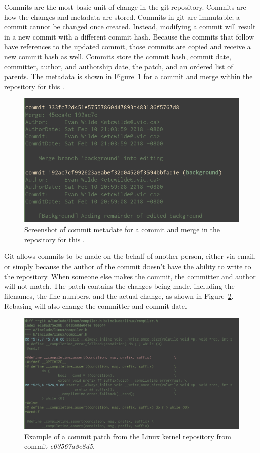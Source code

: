 Commits are the most basic unit of change in the git repository.
Commits are how the changes and metadata are stored.
Commits in git are immutable; a commit cannot be changed once created.
Instead, modifying a commit will result
in a new commit with a different commit hash.
Because the commits that follow have references to the updated commit,
those commits are copied and receive a new commit hash as well.
Commits store the commit hash, commit date,
committer, author, and authorship date, the patch, and an ordered list
of parents. The metadata is shown in Figure~\ref{fig:commit_metadata}
for a commit and merge within the repository for this \paper{}.

\begin{figure}[htpb]
  \centering
  \includegraphics[width=0.8\linewidth]{Figures/background/commit_metadata.png}
  \caption{Screenshot of commit metadate for a commit and merge in the
    repository for this \paper{}.}
  \label{fig:commit_metadata}
\end{figure}

Git allows commits to be made on the behalf of another person, either
via email, or simply because the author of the commit doesn't have the
ability to write to the repository.
When someone else makes the commit, the committer and author will not
match. The patch contains the changes being made, including the
filenames, the line numbers, and the actual change, as shown in
Figure~\ref{fig:commit_patch}.
Rebasing will also change the committer and commit date.

\begin{figure}[htpb]
  \centering
  \includegraphics[width=0.8\linewidth]{Figures/background/commit_patch.png}
  \caption{Example of a commit patch from the Linux kernel repository
    from commit \textit{c03567a8e8d5}.}
  \label{fig:commit_patch}
\end{figure}

